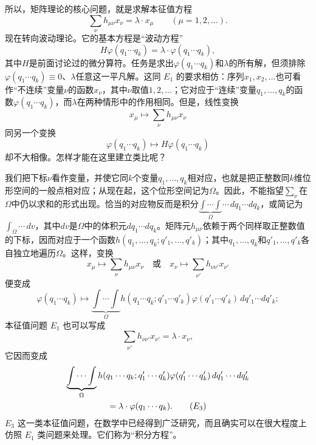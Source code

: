 \documentclass[fontsize=13pt,twoside,openany,headings=normal,parskip=false,bookmarkpackage=false,DIV=calc]{scrbook}
\begin{document}
所以，矩阵理论的核心问题，就是求解本征值方程
\begin{equation}
 \sum_\nu h_{\mu\nu}x_\nu=\lambda\cdot x_\mu\qquad(\mu=1,2,\ldots).
 \tag{$E_1$}\label{eq:I.3.E1}
\end{equation}
现在转向波动理论。它的基本方程是“波动方程”
\begin{equation}
 H\varphi(q_1\cdots q_k)=\lambda\cdot\varphi(q_1\cdots q_k),
 \tag{$E_2$}\label{eq:I.3.E2}
\end{equation}
其中$H$是前面讨论过的微分算符。任务是求出$\varphi(q_1\cdots q_k)$和$\lambda$的所有解，但须排除$\varphi(q_1\cdots q_k)\equiv0$、$\lambda$任意这一平凡解。这同 \hyperref[eq:I.3.E1]{$E_1$} 的要求相仿：序列$x_1,\allowbreak x_2,\allowbreak \ldots$也可看作“不连续”变量$\nu$的函数$x_\nu$，其中$\nu$取值$1,\allowbreak 2,\allowbreak \ldots$；它对应于“连续”变量$q_1,\allowbreak \ldots,\allowbreak q_k$的函数$\varphi(q_1\cdots q_k)$，而$\lambda$在两种情形中的作用相同。但是，线性变换
\[
 x_\mu\longmapsto\sum_\nu h_{\mu\nu}x_\nu
\]
同另一个变换
\[
 \varphi(q_1\cdots q_k)\longmapsto H\varphi(q_1\cdots q_k)
\]
却不大相像。怎样才能在这里建立类比呢？

我们把下标$\nu$看作变量，并使它同$k$个变量$q_1,\allowbreak \ldots,\allowbreak q_k$相对应，也就是把正整数同$k$维位形空间的一般点相对应；从现在起，这个位形空间记为$\Omega$。因此，不能指望$\sum_\nu$在$\Omega$中仍以求和的形式出现。恰当的对应物反而是积分$\underbrace{\int\cdots\int}_{\Omega}\cdots\,dq_1\cdots dq_k$，或简记为$\int_\Omega\cdots\,dv$，其中$dv$是$\Omega$中的体积元$dq_1\cdots dq_k$。矩阵元$h_{\mu\nu}$依赖于两个同样取正整数值的下标，因而对应于一个函数$h(q_1,\allowbreak \ldots,\allowbreak q_k;q'_1,\allowbreak \ldots,\allowbreak q'_k)$；其中$q_1,\allowbreak \ldots,\allowbreak q_k$和$q'_1,\allowbreak \ldots,\allowbreak q'_k$各自独立地遍历$\Omega$。这样，变换
\[
 x_\mu\longmapsto\sum_\nu h_{\mu\nu}x_\nu
 \quad\text{或}\quad
 x_\nu\longmapsto\sum_{\nu'}h_{\nu\nu'}x_{\nu'}
\]
便变成
\[
 \varphi(q_1\cdots q_k)\longmapsto
 \underbrace{\int\cdots\int}_{\Omega} h(q_1\cdots q_k;q'_1\cdots q'_k)
 \varphi(q'_1\cdots q'_k)\,dq'_1\cdots dq'_k;
\]
本征值问题 \hyperref[eq:I.3.E1]{$E_1$} 也可以写成
\[
 \sum_{\nu'}h_{\nu\nu'}x_{\nu'}=\lambda\cdot x_\nu,
\]
它因而变成
\begin{gather}
 \underbrace{\int\cdots\int}_{\Omega} h(q_1\cdots q_k;q'_1\cdots q'_k)
 \varphi(q'_1\cdots q'_k)\,dq'_1\cdots dq'_k\notag\\
 =\lambda\cdot\varphi(q_1\cdots q_k).
 \tag{$E_3$}\label{eq:I.3.E3}
\end{gather}\hypertarget{origpage-13}{}\label{origpage-13}\hyperref[eq:I.3.E3]{$E_3$} 这一类本征值问题，在数学中已经得到广泛研究，而且确实可以在很大程度上仿照 \hyperref[eq:I.3.E1]{$E_1$} 类问题来处理。它们称为“积分方程”。
\end{document}
